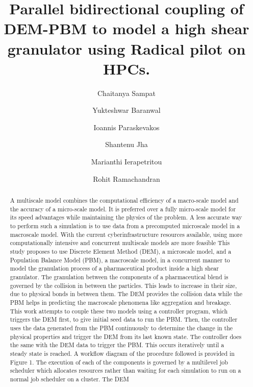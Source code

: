 \documentclass[preprint,11pt,authoryear]{elsarticle}
\begin{document}
\begin{frontmatter}

\title{Parallel bidirectional coupling of DEM-PBM to model a high shear granulator 
using Radical pilot on HPCs.}
\author[add1]{Chaitanya Sampat}
\author[add1]{Yukteshwar Baranwal}
\author[add2]{Ioannis Paraskevakos}
\author[add2]{Shantenu Jha}
\author[add1]{Marianthi Ierapetritou}
\author[add1]{Rohit Ramachandran}
\address[add1]{Department of Chemical and Biochemical Engineering, Rutgers, The State University of New
Jersey, Piscataway, NJ, USA-08854}
\address[add2]{Electrical and Computer Engineering, Rutgers, The State University of New Jersey, 
Piscataway, NJ, USA-08854}

\begin{abstract}
A multiscale model combines the computational efficiency of a macro-scale model and the 
accuracy of a micro-scale model. It is preferred over a fully micro-scale model for its speed 
advantages while maintaining the physics of the problem. A less accurate way to perform such a
simulation is to use data from a precomputed microscale model in a macroscale model. With the
current cyberinfrastructure resources available, using more computationally intensive and 
concurrent multiscale models are more feasible This study proposes to use Discrete Element Method
(DEM), a microscale model, and a Population Balance Model (PBM), a macroscale model, in a
concurrent manner to model the granulation process of a pharmaceutical product inside a high
shear granulator. The granulation between the components of a pharmaceutical blend is governed
by the collision in between the particles. This leads to increase in their size, due to physical bonds
in between them. The DEM provides the collision data while the PBM helps in predicting the
macroscale phenomena like aggregation and breakage. This work attempts to couple these two
models using a controller program, which triggers the DEM first, to give initial seed data to run
the PBM. Then, the controller uses the data generated from the PBM continuously to determine
the change in the physical properties and trigger the DEM from its last known state. The controller
does the same with the DEM data to trigger the PBM. This occurs iteratively until a steady state
is reached. A workflow diagram of the procedure followed is provided in Figure 1. The execution
of each of the components is governed by a multilevel job scheduler which allocates resources
rather than waiting for each simulation to run on a normal job scheduler on a cluster. The DEM

\end{abstract}
\end{frontmatter}
\end{document}

